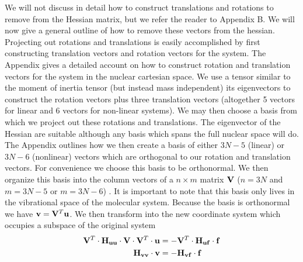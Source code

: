 We will not discuss in detail how to construct translations and rotations to remove from the Hessian matrix, but we refer the reader to Appendix B.
We will now give a general outline of how to remove these vectors from the hessian.
Projecting out rotations and translations is easily accomplished by first constructing translation vectors and rotation vectors for the system. 
The Appendix gives a detailed account on how to construct rotation and translation vectors for the system in the nuclear cartesian space.
We use a tensor similar to the moment of inertia tensor (but instead mass independent)
its eigenvectors to construct the rotation vectors plus three translation vectors (altogether 5
vectors for linear and 6 vectors for non-linear systems). 
We may then choose a basis from which we project out these rotations and translations.  
The eigenvector of the Hessian are suitable although any basis which spans the full nuclear space will do.
The Appendix outlines how we then create a basis of either $3N-5$ (linear) or $3N-6$ (nonlinear) vectors which are orthogonal to our rotation and translation vectors.
For convenience we choose this basis to be orthonormal.  
We then organize this basis into the column vectors of a $n\times m$ matrix ${\bf{V}}$ ($n=3N$ and $m=3N-5$ or $m=3N-6$) .
It is important to note that this basis only lives in the vibrational space of the molecular system.  
Because the basis is orthonormal we have ${\bf{v}} = {\bf{V}}^T{\bf{u}}$. 
We then transform  into the new coordinate system which occupies a subspace of the original system 
\begin{equation}
\begin{split}
\label{eq:HessTrans}
{\mathbf V}^{T} \cdot {\mathbf H}_{{\bf{u}} {\bf{u}}} \cdot {\mathbf V} \cdot {\mathbf V}^{T} \cdot {\ensuremath{\bf{u}}} &= - {\mathbf V}^{T} \cdot {\mathbf H}_{{\bf{u}} {\bf{f}}} \cdot {\ensuremath{\bf{f}}} \\
{\bf{H_{{\ensuremath{\bf{v}}}{\ensuremath{\bf{v}}}}}} \cdot {\ensuremath{\bf{v}}} &= -{\bf{H_{{\ensuremath{\bf{v}}}{\ensuremath{\bf{f}}}}}} \cdot {\ensuremath{\bf{f}}}
\end{split}
\end{equation}
